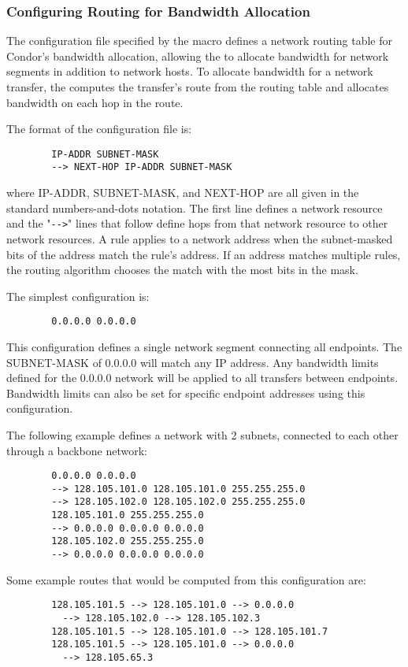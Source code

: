 \subsubsection{\label{sec:Bandwidth-Alloc-Routes}
Configuring Routing for Bandwidth Allocation}

The configuration file specified by the
 macro defines a network routing table
for Condor's bandwidth allocation, allowing the  to
allocate bandwidth for network segments in addition to network hosts.
To allocate bandwidth for a network transfer, the 
computes the transfer's route from the routing table and allocates
bandwidth on each hop in the route.

The format of the configuration file is:
\begin{verbatim}
        IP-ADDR SUBNET-MASK
        --> NEXT-HOP IP-ADDR SUBNET-MASK
\end{verbatim}
where IP-ADDR, SUBNET-MASK, and NEXT-HOP are all given in the standard
numbers-and-dots notation.  The first line defines a network resource
and the "\verb+-->+" lines that follow define hops from that network resource
to other network resources.
A rule applies to a network address when the subnet-masked bits of the
address match the rule's address.
If an address matches multiple rules, the routing algorithm chooses
the match with the most bits in the mask.

The simplest configuration is:
\begin{verbatim}
        0.0.0.0 0.0.0.0
\end{verbatim}
This configuration defines a single network segment connecting all
endpoints.
The SUBNET-MASK of 0.0.0.0 will match any IP address.
Any bandwidth limits defined for the 0.0.0.0 network will be applied
to all transfers between endpoints.
Bandwidth limits can also be set for specific endpoint addresses using
this configuration.

The following example defines a network with 2 subnets, connected to
each other through a backbone network:
\begin{verbatim}
        0.0.0.0 0.0.0.0
        --> 128.105.101.0 128.105.101.0 255.255.255.0
        --> 128.105.102.0 128.105.102.0 255.255.255.0
        128.105.101.0 255.255.255.0
        --> 0.0.0.0 0.0.0.0 0.0.0.0
        128.105.102.0 255.255.255.0
        --> 0.0.0.0 0.0.0.0 0.0.0.0
\end{verbatim}
Some example routes that would be computed from this configuration
are:
\begin{verbatim}
        128.105.101.5 --> 128.105.101.0 --> 0.0.0.0
          --> 128.105.102.0 --> 128.105.102.3
        128.105.101.5 --> 128.105.101.0 --> 128.105.101.7
        128.105.101.5 --> 128.105.101.0 --> 0.0.0.0 
          --> 128.105.65.3
\end{verbatim}

